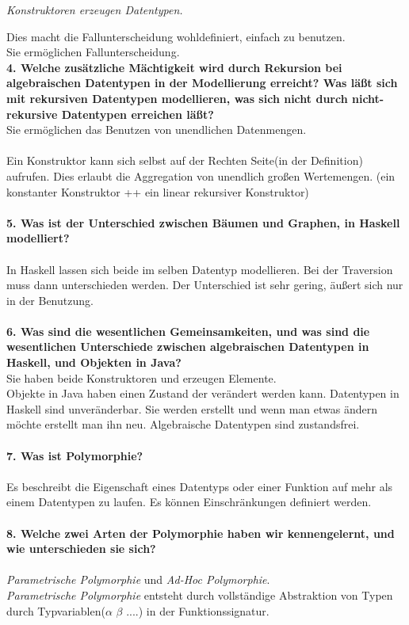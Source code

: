 \documentclass{article}
\begin{document}
\emph{Konstruktoren erzeugen Datentypen.}

Dies macht die Fallunterscheidung wohldefiniert, einfach zu benutzen.\\

Sie ermöglichen Fallunterscheidung.
\\
\textbf{4. Welche zusätzliche Mächtigkeit wird durch Rekursion bei algebraischen Datentypen in der Modellierung erreicht? Was läßt sich mit rekursiven Datentypen modellieren, was sich nicht durch nicht-rekursive Datentypen erreichen läßt?}
\\
Sie ermöglichen das Benutzen von unendlichen Datenmengen.\\
\\
Ein Konstruktor kann sich selbst auf der Rechten Seite(in der Definition) aufrufen.
Dies erlaubt die Aggregation von unendlich gro\ss en Wertemengen.
 (ein konstanter Konstruktor ++ ein linear rekursiver Konstruktor)
\\
\\
\textbf{5. Was ist der Unterschied zwischen Bäumen und Graphen, in Haskell modelliert?}
\\
\\
In Haskell lassen sich beide im selben Datentyp modellieren. Bei der Traversion muss dann unterschieden werden. Der Unterschied ist sehr gering, äußert sich nur in der Benutzung.
\\
\\
\textbf{6. Was sind die wesentlichen Gemeinsamkeiten, und was sind die wesentlichen Unterschiede zwischen algebraischen Datentypen in Haskell, und Objekten in Java?}
\\
Sie haben beide Konstruktoren und erzeugen Elemente.
\\
Objekte in Java haben einen Zustand der ver\"andert werden kann. Datentypen in Haskell sind unver\"anderbar. Sie werden erstellt und wenn man etwas \"andern m\"ochte erstellt man ihn neu. Algebraische Datentypen sind zustandsfrei.
\\
\\
\textbf{7. Was ist Polymorphie?}
\\
\\
Es beschreibt die Eigenschaft eines Datentyps oder einer Funktion auf mehr als einem Datentypen zu laufen. Es k\"onnen Einschr\"ankungen definiert werden.
\\
\\
\textbf{8. Welche zwei Arten der Polymorphie haben wir kennengelernt, und wie unterschieden sie sich?}
\\
\\
 \emph{Parametrische Polymorphie} und \emph{Ad-Hoc Polymorphie}. 
\\
\emph{Parametrische Polymorphie} entsteht durch vollständige Abstraktion von Typen durch Typvariablen($\alpha$ $\beta$ ....) in der Funktionssignatur.
\end{document}
